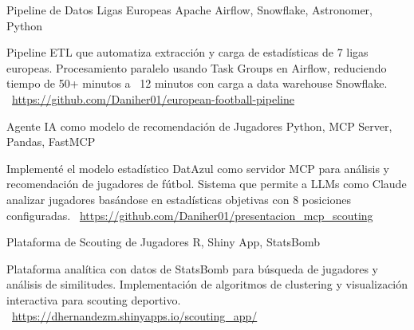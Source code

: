 \documentclass[]{awesome-cv}
\begin{document}
\begin{cventries}
	\vspace{-3mm}
	\cventry
	{}
	{Pipeline de Datos Ligas Europeas \vspace{-5mm}}
	{Apache Airflow, Snowflake, Astronomer, Python \vspace{-5mm}}
	{}
	{\begin{cvsectionnormaltext}
		\item {Pipeline ETL que automatiza extracción y carga de estadísticas de 7 ligas europeas. Procesamiento paralelo usando Task Groups en Airflow, reduciendo tiempo de 50+ minutos a ~12 minutos con carga a data warehouse Snowflake.
		\newline \faLink\ \href{https://github.com/Daniher01/actualizacion_ligas_futbol}{https://github.com/Daniher01/european-football-pipeline}}
	\end{cvsectionnormaltext}}

	\vspace{-3mm}
	\cventry
	{}
	{Agente IA como modelo de recomendación de Jugadores \vspace{-5mm}}
	{Python, MCP Server, Pandas, FastMCP \vspace{-5mm}}
	{}
	{\begin{cvsectionnormaltext}
		\item {Implementé el modelo estadístico DatAzul como servidor MCP para análisis y recomendación de jugadores de fútbol. Sistema que permite a LLMs como Claude analizar jugadores basándose en estadísticas objetivas con 8 posiciones configuradas.
		\newline \faLink\ \href{https://github.com/Daniher01/presentacion_mcp_scouting}{https://github.com/Daniher01/presentacion\_mcp\_scouting}}
	\end{cvsectionnormaltext}}

	\vspace{-3mm}
	\cventry
	{}
	{Plataforma de Scouting de Jugadores \vspace{-5mm}}
	{R, Shiny App, StatsBomb \vspace{-5mm}}
	{}
	{\begin{cvsectionnormaltext}
		\item {Plataforma analítica con datos de StatsBomb para búsqueda de jugadores y análisis de similitudes. Implementación de algoritmos de clustering y visualización interactiva para scouting deportivo.
		\newline \faLink\ \href{https://dhernandezm.shinyapps.io/scouting_app/}{https://dhernandezm.shinyapps.io/scouting\_app/}}
	\end{cvsectionnormaltext}}


\end{cventries}
\end{document}
